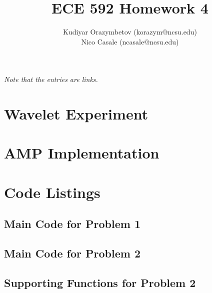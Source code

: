 \documentclass[]{../ncmathy}
\begin{document}
\title{ECE 592 Homework 4}
\author{Kudiyar Orazymbetov (korazym@ncsu.edu)\\Nico Casale (ncasale@ncsu.edu)}
\maketitle

\textit{Note that the entries are links.}
\tableofcontents
\listoffigures
\lstlistoflistings

\pagebreak

\section{Wavelet Experiment}
	

\pagebreak
\section{AMP Implementation}
	
	
\pagebreak
\section{Code Listings}
	
	\subsection{Main Code for Problem 1}
		

	\subsection{Main Code for Problem 2}
		

	\subsection{Supporting Functions for Problem 2}
		
		
		
\end{document}
